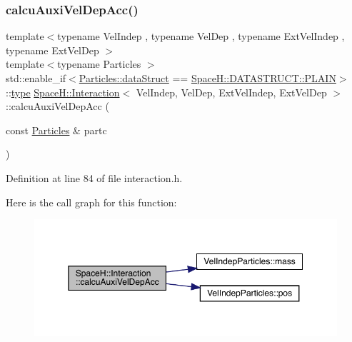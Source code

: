 \subsubsection{\texorpdfstring{calcu\+Auxi\+Vel\+Dep\+Acc()}{calcuAuxiVelDepAcc()}\hspace{0.1cm}{\footnotesize\ttfamily [1/2]}}
{\footnotesize\ttfamily template$<$typename Vel\+Indep , typename Vel\+Dep , typename Ext\+Vel\+Indep , typename Ext\+Vel\+Dep $>$ \\
template$<$typename Particles $>$ \\
std\+::enable\+\_\+if$<$\mbox{\hyperlink{class_vel_indep_particles_a6d357b21c216a2b079b1927c18de0b8f}{Particles\+::data\+Struct}} == \mbox{\hyperlink{namespace_space_h_a0af19f79a6498e99dbda772053d44a72af62eb0bf5e5c72e80983fbbac1cb70e5}{Space\+H\+::\+D\+A\+T\+A\+S\+T\+R\+U\+C\+T\+::\+P\+L\+A\+IN}}$>$\+::\mbox{\hyperlink{class_space_h_1_1_interaction_a0bed18b8b8efcb42be264a255f931be6}{type}} \mbox{\hyperlink{class_space_h_1_1_interaction}{Space\+H\+::\+Interaction}}$<$ Vel\+Indep, Vel\+Dep, Ext\+Vel\+Indep, Ext\+Vel\+Dep $>$\+::calcu\+Auxi\+Vel\+Dep\+Acc (\begin{DoxyParamCaption}\item[{const \mbox{\hyperlink{struct_particles}{Particles}} \&}]{partc }\end{DoxyParamCaption})\hspace{0.3cm}{\ttfamily [inline]}}



Definition at line 84 of file interaction.\+h.

Here is the call graph for this function\+:\nopagebreak
\begin{figure}[H]
\begin{center}
\leavevmode
\includegraphics[width=350pt]{class_space_h_1_1_interaction_ae5763f03d500bc392c44d48cf87fe6fb_cgraph}
\end{center}
\end{figure}
\mbox{\label{class_space_h_1_1_interaction_addc5bcf2c12d28945af7c78a464b599e}} 
